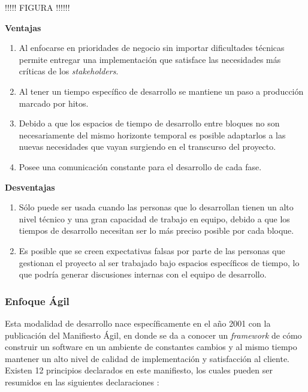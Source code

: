 !!!!! FIGURA !!!!!!

\textbf{Ventajas}
\begin{enumerate}
  \item Al enfocarse en prioridades de negocio sin importar dificultades técnicas permite entregar una implementación que satisface las necesidades más críticas de los \textit{stakeholders}.
  \item Al tener un tiempo específico de desarrollo se mantiene un paso a producción marcado por hitos.
  \item Debido a que los espacios de tiempo de desarrollo entre bloques no son necesariamente del mismo horizonte temporal es posible adaptarlos a las nuevas necesidades que vayan surgiendo en el transcurso del proyecto.
  \item Posee una comunicación constante para el desarrollo de cada fase.
\end{enumerate}

\textbf{Desventajas}
\begin{enumerate}
  \item Sólo puede ser usada cuando las personas que lo desarrollan tienen un alto nivel técnico y una gran capacidad de trabajo en equipo, debido a que los tiempos de desarrollo necesitan ser lo más preciso posible por cada bloque.
  \item Es posible que se creen expectativas falsas por parte de las personas que gestionan el proyecto al ser trabajado bajo espacios específicos de tiempo, lo que podría generar discusiones internas con el equipo de desarrollo.
\end{enumerate}

\subsubsection{Enfoque Ágil \label{sec:incremental_model}}

Esta modalidad de desarrollo nace específicamente en el año 2001 con la publicación del Manifiesto Ágil, en donde se da a conocer un \textit{framework} de cómo construir un software en un ambiente de constantes cambios y al mismo tiempo mantener un alto nivel de calidad de implementación y satisfacción al cliente. Existen 12 principios declarados en este manifiesto, los cuales pueden ser resumidos en las siguientes declaraciones \cite{agile}:

